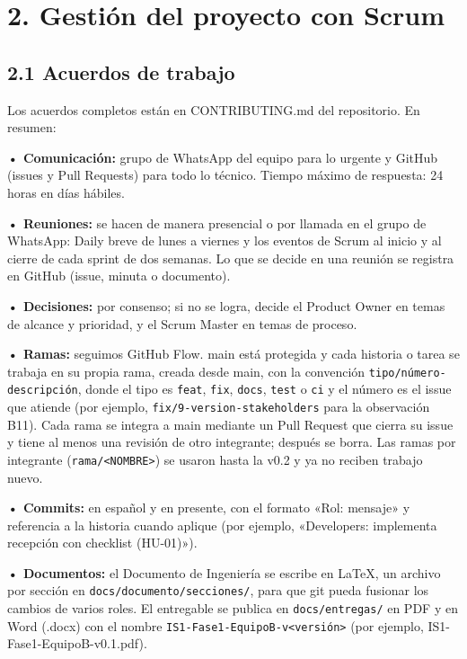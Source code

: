 \section{2. Gestión del proyecto con
Scrum}\label{gestiuxf3n-del-proyecto-con-scrum}

\subsection{2.1 Acuerdos de trabajo}\label{acuerdos-de-trabajo}

Los acuerdos completos están en CONTRIBUTING.md del repositorio. En
resumen:

\textbf{• Comunicación:} grupo de WhatsApp del equipo para lo
urgente y GitHub (issues y Pull Requests) para todo lo técnico. Tiempo
máximo de respuesta: 24 horas en días hábiles.

\textbf{• Reuniones:} se hacen de manera presencial o por llamada en el
grupo de WhatsApp: Daily breve de lunes a viernes y los eventos de Scrum
al inicio y al cierre de cada sprint de dos semanas. Lo que se decide en
una reunión se registra en GitHub (issue, minuta o documento).

\textbf{• Decisiones:} por consenso; si no se logra, decide el Product
Owner en temas de alcance y prioridad, y el Scrum Master en temas de
proceso.

\textbf{• Ramas:} seguimos GitHub Flow. main está protegida y cada
historia o tarea se trabaja en su propia rama, creada desde main, con la
convención \texttt{tipo/número-descripción}, donde el tipo es
\texttt{feat}, \texttt{fix}, \texttt{docs}, \texttt{test} o \texttt{ci} y
el número es el issue que atiende (por ejemplo,
\texttt{fix/9-version-stakeholders} para la observación B11). Cada rama
se integra a main mediante un Pull Request que cierra su issue y tiene al
menos una revisión de otro integrante; después se borra. Las ramas por
integrante (\texttt{rama/<NOMBRE>}) se usaron hasta la v0.2 y ya no
reciben trabajo nuevo.

\textbf{• Commits:} en español y en presente, con el formato
«Rol: mensaje» y referencia a la historia cuando aplique (por ejemplo,
«Developers: implementa recepción con checklist (HU-01)»).

\textbf{• Documentos:} el Documento de Ingeniería se escribe en LaTeX,
un archivo por sección en \texttt{docs/documento/secciones/}, para que
git pueda fusionar los cambios de varios roles. El entregable se publica en
\texttt{docs/entregas/} en PDF y en Word (.docx) con el nombre
\texttt{IS1-Fase1-EquipoB-v<versión>} (por ejemplo, IS1-Fase1-EquipoB-v0.1.pdf).


